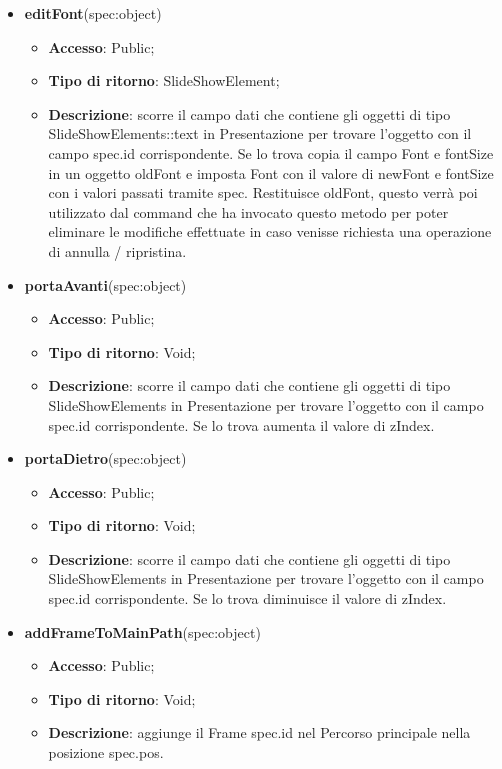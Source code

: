 {\begin{itemize}
\begin{itemize}
			\end{itemize}
			\item \textbf{editFont}(spec:object)
			\begin{itemize}
				\item \textbf{Accesso}: Public;
				\item \textbf{Tipo di ritorno}: SlideShowElement;
				\item \textbf{Descrizione}: scorre il campo dati che contiene gli oggetti di tipo SlideShowElements::text in Presentazione per trovare l’oggetto con il campo spec.id corrispondente. Se lo trova copia il campo Font e fontSize in un oggetto oldFont e imposta Font con il valore di newFont e fontSize con i valori passati tramite spec. Restituisce oldFont, questo verrà poi utilizzato dal command che ha invocato questo metodo per poter eliminare le modifiche effettuate in caso venisse richiesta una operazione di annulla / ripristina.
			\end{itemize}
			\item \textbf{portaAvanti}(spec:object)
			\begin{itemize}
				\item \textbf{Accesso}: Public;
				\item \textbf{Tipo di ritorno}: Void;
				\item \textbf{Descrizione}: scorre il campo dati che contiene gli oggetti di tipo SlideShowElements in Presentazione per trovare l’oggetto con il campo spec.id corrispondente. Se lo trova aumenta il valore di zIndex.
			\end{itemize}
			\item \textbf{portaDietro}(spec:object)
			\begin{itemize}
				\item \textbf{Accesso}: Public;
				\item \textbf{Tipo di ritorno}: Void;
				\item \textbf{Descrizione}: scorre il campo dati che contiene gli oggetti di tipo SlideShowElements in Presentazione per trovare l’oggetto con il campo spec.id corrispondente. Se lo trova diminuisce il valore di zIndex.
			\end{itemize}
			\item \textbf{addFrameToMainPath}(spec:object)
			\begin{itemize}
				\item \textbf{Accesso}: Public;
				\item \textbf{Tipo di ritorno}: Void;
				\item \textbf{Descrizione}: aggiunge il Frame spec.id nel Percorso principale nella posizione spec.pos.

\end{itemize}
\end{itemize}}
